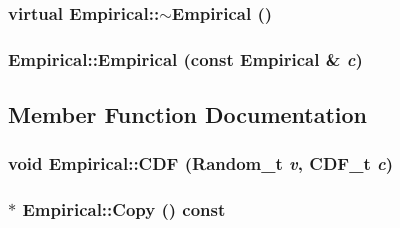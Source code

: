 \hypertarget{classEmpirical_d9422bac95c25865158cade0982516e4}{
\subsubsection[{$\sim$Empirical}]{\setlength{\rightskip}{0pt plus 5cm}virtual Empirical::$\sim$Empirical ()}}
\label{classEmpirical_d9422bac95c25865158cade0982516e4}


\hypertarget{classEmpirical_c8e3a99d92dae74fe99ca47829821734}{
\subsubsection[{Empirical}]{\setlength{\rightskip}{0pt plus 5cm}Empirical::Empirical (const {\bf Empirical} \& {\em c})}}
\label{classEmpirical_c8e3a99d92dae74fe99ca47829821734}




\subsection{Member Function Documentation}
\hypertarget{classEmpirical_edc41dd73a4398ac77d537c78b9558de}{
\subsubsection[{CDF}]{\setlength{\rightskip}{0pt plus 5cm}void Empirical::CDF ({\bf Random\_\-t} {\em v}, \/  {\bf CDF\_\-t} {\em c})}}
\label{classEmpirical_edc41dd73a4398ac77d537c78b9558de}


\hypertarget{classEmpirical_d5429fdf863d53d74649cc8c630cfb0b}{
\subsubsection[{Copy}]{ $\ast$ Empirical::Copy () const}}
\label{classEmpirical_d5429fdf863d53d74649cc8c630cfb0b}




